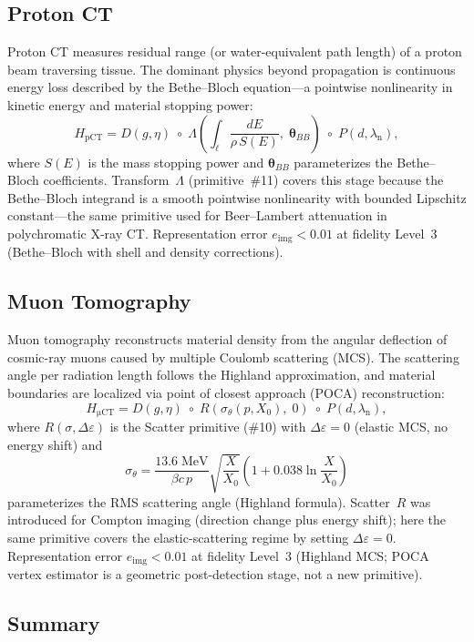 \documentclass[11pt]{article}
\begin{document}
\subsection{Proton CT}

Proton CT measures residual range (or water-equivalent path length) of a
proton beam traversing tissue.  The dominant physics beyond propagation is
continuous energy loss described by the Bethe--Bloch equation---a pointwise
nonlinearity in kinetic energy and material stopping power:
\[
  H_{\mathrm{pCT}} = D(g,\eta) \;\circ\;
  \Lambda\!\left(\textstyle\int_\ell \frac{dE}{\rho\,S(E)},\;
  \boldsymbol{\theta}_{BB}\right)
  \;\circ\; P(d,\lambda_{\mathrm{n}}),
\]
where $S(E)$ is the mass stopping power and $\boldsymbol{\theta}_{BB}$
parameterizes the Bethe--Bloch coefficients.
Transform~$\Lambda$ (primitive~\#11) covers this stage because the
Bethe--Bloch integrand is a smooth pointwise nonlinearity with bounded
Lipschitz constant---the same primitive used for Beer--Lambert attenuation
in polychromatic X-ray CT.  Representation error $e_{\mathrm{img}} < 0.01$
at fidelity Level~3 (Bethe--Bloch with shell and density corrections).

\subsection{Muon Tomography}

Muon tomography reconstructs material density from the angular deflection of
cosmic-ray muons caused by multiple Coulomb scattering (MCS).  The scattering
angle per radiation length follows the Highland approximation, and material
boundaries are localized via point of closest approach (POCA) reconstruction:
\[
  H_{\mathrm{\mu CT}} = D(g,\eta) \;\circ\;
  R\!\left(\sigma_\theta(p,X_0),\;0\right)
  \;\circ\; P(d,\lambda_{\mathrm{n}}),
\]
where $R(\sigma,\Delta\varepsilon)$ is the Scatter primitive (\#10) with
$\Delta\varepsilon = 0$ (elastic MCS, no energy shift) and
\[
  \sigma_\theta = \frac{13.6\;\mathrm{MeV}}{\beta c\, p}
  \sqrt{\frac{X}{X_0}}
  \left(1 + 0.038\ln\frac{X}{X_0}\right)
\]
parameterizes the RMS scattering angle (Highland formula).
Scatter~$R$ was introduced for Compton imaging (direction change plus energy
shift); here the same primitive covers the elastic-scattering regime by
setting $\Delta\varepsilon = 0$.  Representation error $e_{\mathrm{img}} < 0.01$
at fidelity Level~3 (Highland MCS; POCA vertex estimator is a geometric
post-detection stage, not a new primitive).

\subsection{Summary}
\end{document}
